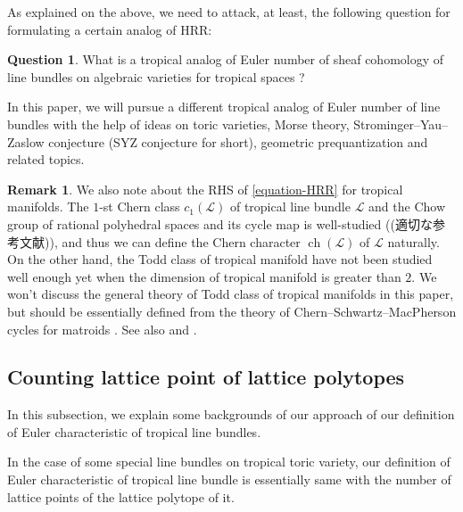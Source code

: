 \documentclass[a4paper,dvipdfmx,reqno,12pt]{amsart}
\theoremstyle{definition}
\newtheorem{question}[theorem]{Question}
\newtheorem{remark}[theorem]{Remark}
\newcommand{\opn}[1]{\operatorname{#1}}
\numberwithin{equation}{section}
\begin{document}
As explained on the above, we need to attack, at least,
the following question for formulating a certain 
analog of HRR:

\begin{question}
What is a tropical analog of Euler number of sheaf 
cohomology of line bundles on algebraic varieties for 
tropical spaces ?
\end{question}

In this paper, we will pursue a different tropical
analog of Euler number of line bundles with the help of 
ideas on toric varieties, Morse theory,
Strominger--Yau--Zaslow conjecture
(SYZ conjecture for short), geometric prequantization
and related topics.

\begin{remark}
\label{remark-todd-class}
We also note about the RHS of \cref{equation-HRR} 
for tropical manifolds. 
The $1$-st Chern class $c_1(\mathcal{L})$ of 
tropical line bundle $\mathcal{L}$ and 
the Chow group of rational polyhedral spaces and 
its cycle map is 
well-studied ((適切な参考文献\cite{gross2019sheaftheoretic})),
and thus we can define the Chern character
$\opn{ch}(\mathcal{L})$ of 
$\mathcal{L}$ naturally.
On the other hand, the Todd class of tropical manifold
have not been studied well enough yet  
when the dimension of tropical manifold is greater
than $2$.
We won't discuss the general theory of Todd class of tropical 
manifolds in this paper, 
but should be essentially defined from the theory of 
Chern--Schwartz--MacPherson cycles for matroids 
\cite[Previous work]{lopezdemedranoChernSchwartzMacPhersonCyclesMatroids2020}.
See also \cite[5.3]{mikhalkinTropicalGeometryIts2006} and
\cite[Definition 3.20]{shawTropicalSurfaces2015a}.
\end{remark}

\subsection{Counting lattice point of lattice polytopes}
In this subsection, we explain some backgrounds of 
our approach of our definition of Euler characteristic
of tropical line bundles.

In the case of some special line bundles on
tropical toric variety, our definition of Euler 
characteristic of tropical line bundle is essentially same with the
number of lattice points of the lattice polytope of it.
\end{document}
